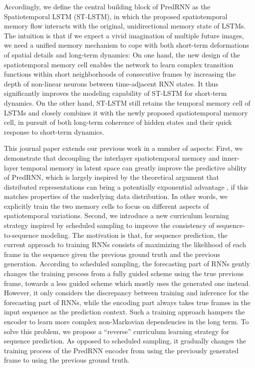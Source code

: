 \documentclass[10pt,journal,compsoc]{IEEEtran}
\begin{document}
Accordingly, we define the central building block of PredRNN as the Spatiotemporal LSTM (ST-LSTM), in which the proposed spatiotemporal memory flow interacts with the original, unidirectional memory state of LSTMs. 
The intuition is that if we expect a vivid imagination of multiple future images, we need a unified memory mechanism to cope with both short-term deformations of spatial details and long-term dynamics: On one hand, the new design of the spatiotemporal memory cell enables the network to learn complex transition functions within short neighborhoods of consecutive frames by increasing the depth of non-linear neurons between time-adjacent RNN states. It thus significantly improves the modeling capability of ST-LSTM for short-term dynamics. 
On the other hand, ST-LSTM still retains the temporal memory cell of LSTMs and closely combines it with the newly proposed spatiotemporal memory cell, in pursuit of both long-term coherence of hidden states and their quick response to short-term dynamics.



This journal paper extends our previous work \cite{wang2017predrnn} in a number of aspects: First, we demonstrate that decoupling the interlayer spatiotemporal memory and inner-layer temporal memory in latent space can greatly improve the predictive ability of PredRNN, which is largely inspired by the theoretical argument that distributed representations can bring a potentially exponential advantage \cite{pascanu2013number}, if this matches properties of the underlying data distribution.
In other words, we explicitly train the two memory cells to focus on different aspects of spatiotemporal variations.
Second, we introduce a new curriculum learning strategy inspired by scheduled sampling \cite{bengio2015scheduled} to improve the consistency of sequence-to-sequence modeling. The motivation is that, for sequence prediction, the current approach to training RNNs consists of maximizing the likelihood of each frame in the sequence given the previous ground truth and the previous generation. 
According to scheduled sampling, the forecasting part of RNNs gently changes the training process from a fully guided scheme using the true previous frame, towards a less guided scheme which mostly uses the generated one instead. 
However, it only considers the discrepancy between training and inference for the forecasting part of RNNs, while the encoding part always takes true frames in the input sequence as the prediction context. Such a training approach hampers the encoder to learn more complex non-Markovian dependencies in the long term. 
To solve this problem, we propose a ``reverse'' curriculum learning strategy for sequence prediction. As opposed to scheduled sampling, it gradually changes the training process of the PredRNN encoder from using the previously generated frame to using the previous ground truth.
\end{document}
